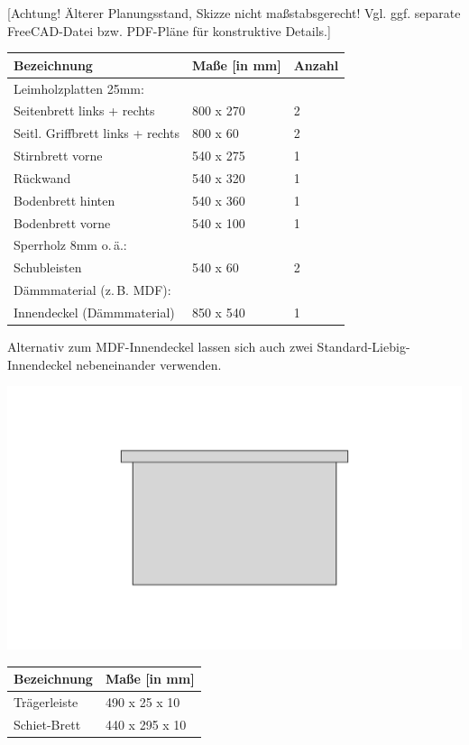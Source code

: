 \documentclass[12pt,a4paper,ngerman]{scrartcl}
\begin{document}
\begin{center}
  [Achtung! Älterer Planungsstand, Skizze nicht maßstabsgerecht!
  Vgl. ggf. separate FreeCAD-Datei bzw. PDF-Pläne für konstruktive Details.]
\end{center}



\begin{center}
\begin{tabular}{lll}
  Bezeichnung &                       Maße [in mm] &          Anzahl \\
  \hline
  Leimholzplatten 25mm: \\
  Seitenbrett links + rechts &        800 x 270 &             2 \\
  Seitl. Griffbrett links + rechts &  800 x 60 &              2 \\
  Stirnbrett vorne &                  540 x 275 &             1 \\
  Rückwand &                          540 x 320 &             1 \\
  Bodenbrett hinten &                 540 x 360 &             1 \\
  Bodenbrett vorne &                  540 x 100 &             1 \\
  \hline
  Sperrholz 8mm o.\,ä.: \\
  Schubleisten &                      540 x 60 &              2 \\
  \hline
  Dämmmaterial (z.\,B. MDF): \\
  Innendeckel (Dämmmaterial) &        850 x 540 &             1 \\
  \hline
\end{tabular}
\end{center}

Alternativ zum MDF-Innendeckel lassen sich auch zwei Standard-Liebig-Innendeckel nebeneinander verwenden.



\begin{center}
\includegraphics[width=.5\textwidth]{schiet}

\begin{tabular}{ll}
  Bezeichnung &                       Maße [in mm] \\
  \hline
  Trägerleiste &                      490 x 25 x 10 \\
  Schiet-Brett &                      440 x 295 x 10 \\
  \hline
\end{tabular}
\end{center}
\end{document}
